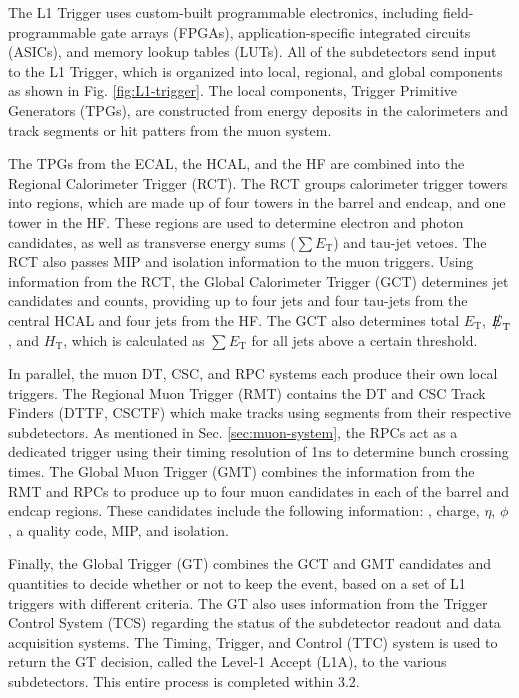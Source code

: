 \documentclass[12pt]{thesis}  %
\def\ET{\ensuremath{{E}_{\mathrm{T}}}}
\def\HT{\ensuremath{{H}_{\mathrm{T}}}}
\def\eslash{\ensuremath{{\hbox{$E$\kern-0.6em\lower-.05ex\hbox{/}\kern0.10em}}}}
\def\met{\mbox{$\eslash_\text{T}$}\xspace} %
\def\sumet{\mbox{$\sum E_\text{T}$}\xspace}
\begin{document}
The L1 Trigger uses custom-built programmable electronics, including field-programmable gate arrays (FPGAs), application-specific integrated circuits (ASICs), and memory lookup tables (LUTs). All of the subdetectors send input to the L1 Trigger, which is organized into local, regional, and global components as shown in Fig. \ref{fig:L1-trigger}. The local components, Trigger Primitive Generators (TPGs), are constructed from energy deposits in the calorimeters and track segments or hit patters from the muon system.

The TPGs from the ECAL, the HCAL, and the HF are combined into the Regional Calorimeter Trigger (RCT). The RCT groups calorimeter trigger towers into regions, which are made up of four towers in the barrel and endcap, and one tower in the HF. These regions are used to determine electron and photon candidates, as well as transverse energy sums (\sumet) and tau-jet vetoes. The RCT also passes MIP and isolation information to the muon triggers. Using information from the RCT, the Global Calorimeter Trigger (GCT) determines jet candidates and counts, providing up to four jets and four tau-jets from the central HCAL and four jets from the HF. The GCT also determines total \ET, \met, and \HT, which is calculated as \sumet for all jets above a certain threshold.

In parallel, the muon DT, CSC, and RPC systems each produce their own local triggers. The Regional Muon Trigger (RMT) contains the DT and CSC Track Finders (DTTF, CSCTF) which make tracks using segments from their respective subdetectors. As mentioned in Sec. \ref{sec:muon-system}, the RPCs act as a dedicated trigger using their timing resolution of 1\unit{ns} to determine bunch crossing times. The Global Muon Trigger (GMT) combines the information from the RMT and RPCs to produce up to four muon candidates in each of the barrel and endcap regions. These candidates include the following information: \pt, charge, $\eta$, $\phi$, a quality code, MIP, and isolation.

Finally, the Global Trigger (GT) combines the GCT and GMT candidates and quantities to decide whether or not to keep the event, based on a set of L1 triggers with different criteria. The GT also uses information from the Trigger Control System (TCS) regarding the status of the subdetector readout and data acquisition systems. The Timing, Trigger, and Control (TTC) system is used to return the GT decision, called the Level-1 Accept (L1A), to the various subdetectors. This entire process is completed within 3.2\mus.
\end{document}
